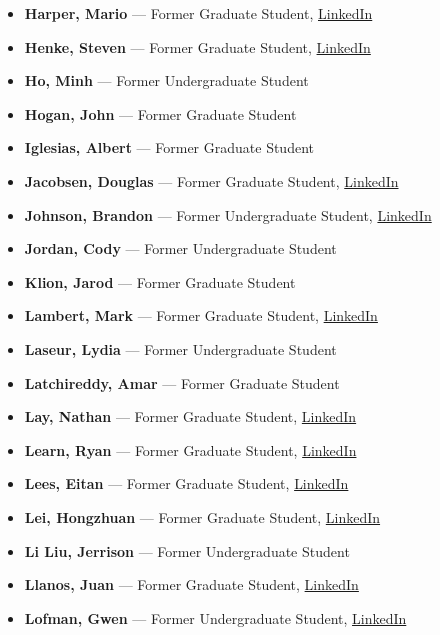 \documentclass[12pt,a4paper]{article}
\begin{document}
\begin{itemize}
    \item \textbf{Harper, Mario} --- Former Graduate Student, \href{https://www.linkedin.com/in/mario-harper-04473b115/}{LinkedIn}
    \item \textbf{Henke, Steven} --- Former Graduate Student, \href{https://www.linkedin.com/in/steven-henke-b816087b/}{LinkedIn}
    \item \textbf{Ho, Minh} --- Former Undergraduate Student
    \item \textbf{Hogan, John} --- Former Graduate Student
    \item \textbf{Iglesias, Albert} --- Former Graduate Student
    \item \textbf{Jacobsen, Douglas} --- Former Graduate Student, \href{https://www.linkedin.com/in/douglas-jacobsen-5a98a89/}{LinkedIn}
    \item \textbf{Johnson, Brandon} --- Former Undergraduate Student, \href{https://www.linkedin.com/in/brandon-johnson-28b97163/}{LinkedIn}
    \item \textbf{Jordan, Cody} --- Former Undergraduate Student
    \item \textbf{Klion, Jarod} --- Former Graduate Student
    \item \textbf{Lambert, Mark} --- Former Graduate Student, \href{https://www.linkedin.com/in/mark-lambert-7058a984/}{LinkedIn}
    \item \textbf{Laseur, Lydia} --- Former Undergraduate Student
    \item \textbf{Latchireddy, Amar} --- Former Graduate Student
    \item \textbf{Lay, Nathan} --- Former Graduate Student, \href{https://www.linkedin.com/in/nathan-lay-3945a034/}{LinkedIn}
    \item \textbf{Learn, Ryan} --- Former Graduate Student, \href{https://www.linkedin.com/in/ryan-learn-33121588/}{LinkedIn}
    \item \textbf{Lees, Eitan} --- Former Graduate Student, \href{https://www.linkedin.com/in/eitan-lees-84b238104/}{LinkedIn}
    \item \textbf{Lei, Hongzhuan} --- Former Graduate Student, \href{https://www.linkedin.com/in/hongzhuan-lei-317201b1/}{LinkedIn}
    \item \textbf{Li Liu, Jerrison} --- Former Undergraduate Student
    \item \textbf{Llanos, Juan} --- Former Graduate Student, \href{https://www.linkedin.com/in/juan-llanos-537443a0/}{LinkedIn}
    \item \textbf{Lofman, Gwen} --- Former Undergraduate Student, \href{https://www.linkedin.com/in/gwen-lofman-2b992014b/}{LinkedIn}

\end{itemize}
\end{document}
